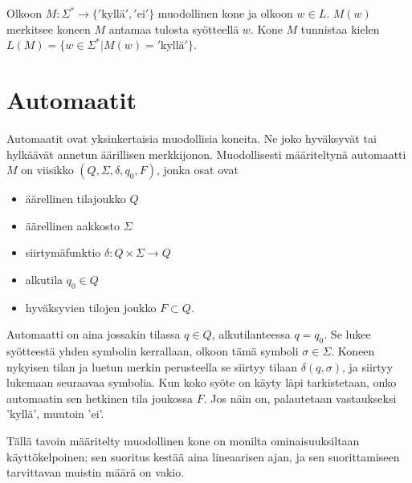\documentclass[a4paper, 12pt]{article}
\theoremstyle{definition}
\theoremstyle{plain}
\begin{document}
Olkoon $M : \Sigma^* \rightarrow \{ '\text{kyllä}', '\text{ei}' \}$ muodollinen kone ja olkoon $w \in L$. $M(w)$ merkitsee koneen $M$ antamaa tulosta syötteellä $w$. Kone $M$ tunnistaa kielen $L(M) = \{w \in \Sigma^* | M(w) = '\text{kyllä}'\}$.


\section{Automaatit}
Automaatit ovat yksinkertaisia muodollisia koneita. Ne joko hyväksyvät tai hylkäävät annetun äärillisen merkkijonon. Muodollisesti määriteltynä automaatti $M$ on viisikko $(Q, \Sigma, \delta, q_0, F)$, jonka osat ovat
\begin{itemize}
\item äärellinen tilajoukko $Q$

\item äärellinen aakkosto $\Sigma$

\item siirtymäfunktio $\delta : Q \times \Sigma \rightarrow Q$

\item alkutila $q_0 \in Q$

\item hyväksyvien tilojen joukko $F \subset Q$.

\end{itemize}

Automaatti on aina jossakin tilassa $q \in Q$, alkutilanteessa $q = q_0$. Se lukee syötteestä yhden symbolin kerrallaan, olkoon tämä symboli $\sigma \in \Sigma$. Koneen nykyisen tilan ja luetun merkin perusteella se siirtyy tilaan $\delta (q, \sigma)$, ja siirtyy lukemaan seuraavaa symbolia. Kun koko syöte on käyty läpi tarkistetaan, onko automaatin sen hetkinen tila joukossa $F$. Jos näin on, palautetaan vastaukseksi 'kyllä', muutoin 'ei'.

Tällä tavoin määritelty muodollinen kone on monilta ominaisuuksiltaan käyttökelpoinen; sen suoritus kestää aina lineaarisen ajan, ja sen suorittamiseen tarvittavan muistin määrä on vakio.
\end{document}
